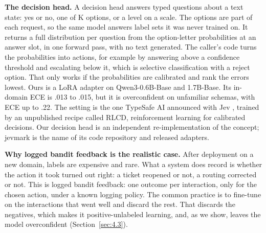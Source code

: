 \documentclass[10pt,letterpaper]{article}
\theoremstyle{plain}
\begin{document}
\textbf{The decision head.} A decision head answers typed questions about a text state: yes or no, one of K options, or a level on a scale. The options are part of each request, so the same model answers label sets it was never trained on. It returns a full distribution per question from the option-letter probabilities at an answer slot, in one forward pass, with no text generated. The caller's code turns the probabilities into actions, for example by answering above a confidence threshold and escalating below it, which is selective classification with a reject option. That only works if the probabilities are calibrated and rank the errors lowest. Ours is a LoRA adapter on Qwen3-0.6B-Base and 1.7B-Base. Its in-domain ECE is .013 to .015, but it is overconfident on unfamiliar schemas, with ECE up to .22. The setting is the one TypeSafe AI announced with Jev \citep{typesafe2026jev}, trained by an unpublished recipe called RLCD, reinforcement learning for calibrated decisions. Our decision head is an independent re-implementation of the concept; jevmark is the name of its code repository and released adapters.

\textbf{Why logged bandit feedback is the realistic case.} After deployment on a new domain, labels are expensive and rare. What a system does record is whether the action it took turned out right: a ticket reopened or not, a routing corrected or not. This is logged bandit feedback: one outcome per interaction, only for the chosen action, under a known logging policy. The common practice is to fine-tune on the interactions that went well and discard the rest. That discards the negatives, which makes it positive-unlabeled learning, and, as we show, leaves the model overconfident (Section~\ref{sec:4.3}).
\end{document}

